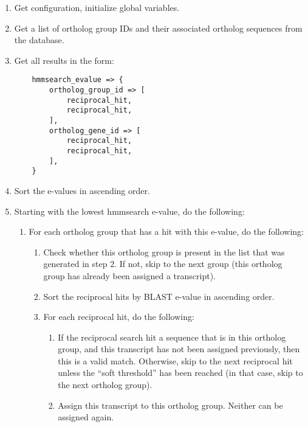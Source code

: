 \begin{enumerate}
	\item Get configuration, initialize global variables.
	\item Get a list of ortholog group IDs and their associated ortholog sequences
		from the database.
	\item Get all results in the form:
	\begin{lstlisting}
	hmmsearch_evalue => {
		ortholog_group_id => [
			reciprocal_hit,
			reciprocal_hit,
		],
		ortholog_gene_id => [
			reciprocal_hit,
			reciprocal_hit,
		],
	}
	\end{lstlisting}
	\item Sort the e-values in ascending order.
	\item Starting with the lowest hmmsearch e-value, do the following:
	\begin{enumerate}
		\item For each ortholog group that has a hit with this e-value, do the following:
		\begin{enumerate}
			\item Check whether this ortholog group is present in the list that was
				generated in step 2. If not, skip to the next group (this ortholog group
				has already been assigned a transcript).
			\item Sort the reciprocal hits by BLAST e-value in ascending order.
			\item For each reciprocal hit, do the following:
			\begin{enumerate}
				\item If the reciprocal search hit a sequence that is in this ortholog
					group, and this transcript has not been assigned previously, then this
					is a valid match. Otherwise, skip to the next reciprocal hit unless
					the ``soft threshold'' has been reached (in that case, skip to the
					next ortholog group).
				\item Assign this transcript to this ortholog group. Neither can be
					assigned again.
			\end{enumerate}
		\end{enumerate}
	\end{enumerate}
\end{enumerate}

